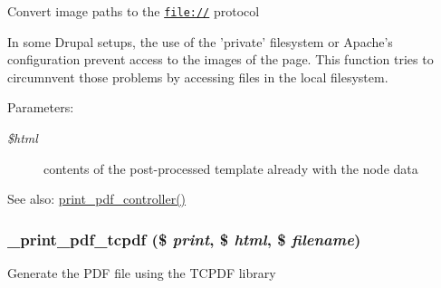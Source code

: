 Convert image paths to the \href{file://}{\tt file://} protocol

In some Drupal setups, the use of the 'private' filesystem or Apache's configuration prevent access to the images of the page. This function tries to circumnvent those problems by accessing files in the local filesystem.

\begin{Desc}
\item[Parameters:]
\begin{description}
\item[{\em \$html}]contents of the post-processed template already with the node data \end{description}
\end{Desc}
\begin{Desc}
\item[See also:]\hyperlink{print__pdf_8pages_8inc_d2eb4e782095c48cf019319afa8fab06}{print\_\-pdf\_\-controller()} \end{Desc}
\hypertarget{print__pdf_8pages_8inc_f7356382db2bd5990ed0b420128053e9}{
\subsubsection[{\_\-print\_\-pdf\_\-tcpdf}]{\setlength{\rightskip}{0pt plus 5cm}\_\-print\_\-pdf\_\-tcpdf (\$ {\em print}, \/  \$ {\em html}, \/  \$ {\em filename})}}
\label{print__pdf_8pages_8inc_f7356382db2bd5990ed0b420128053e9}


Generate the PDF file using the TCPDF library

